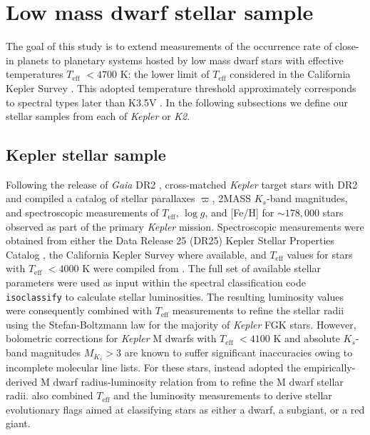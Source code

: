 \documentclass[twocolumn]{emulateapj}
\newcommand{\gaia}[1]{\emph{Gaia}#1}
\newcommand{\kepler}[1]{\emph{Kepler}#1}
\newcommand{\ktwo}[1]{\emph{K2}#1}
\newcommand{\teff}[1]{$T_{\text{eff}}$#1}
\newcommand{\logg}[1]{$\log{g}$#1}
\begin{document}
\section{Low mass dwarf stellar sample} \label{sect:stars}
The goal of this study is to extend measurements of the occurrence rate of close-in planets to planetary systems hosted
by low mass dwarf stars with effective temperatures \teff{} $<4700$ K: the lower limit of \teff{}
considered in the California Kepler Survey \citep[CKS;][]{fulton17}.
This adopted temperature threshold approximately corresponds to spectral types later than
K3.5V \citep{pecaut13}. In the following subsections we define our stellar samples from each of \kepler{} or \ktwo{.}

\subsection{Kepler stellar sample} \label{sect:kep}
Following the release of \gaia{} DR2 \citep{lindegren18}, \cite{berger18} cross-matched \kepler{} target stars
with DR2 and compiled a catalog of stellar
parallaxes $\varpi$, 2MASS $K_s$-band magnitudes, and spectroscopic measurements of \teff{,} \logg{,} and [Fe/H]
for $\sim 178,000$ stars observed as part of the primary \kepler{} mission. Spectroscopic measurements were obtained from
either the Data Release 25 (DR25)
Kepler Stellar Properties Catalog \citep[KSPC;][]{mathur17}, the California
Kepler Survey \citep[CKS;][]{petigura17} where available, and \teff{} values for stars with \teff{} $<4000$ K were compiled from
\cite{gaidos16}. The full set of available stellar parameters were used as input within the spectral classification code
\texttt{isoclassify} \citep{huber17} to calculate stellar luminosities. The resulting luminosity values were consequently combined
with \teff{} measurements to refine the stellar radii using the Stefan-Boltzmann law for the majority of \kepler{} FGK stars.
However, bolometric corrections for \kepler{} M dwarfs with \teff{} $<4100$ K
and absolute $K_s$-band magnitudes $M_{K_s}>3$ are known to suffer significant inaccuracies owing to incomplete
molecular line lists. For these stars, \cite{berger18} instead adopted the empirically-derived M dwarf radius-luminosity
relation from \cite{mann15} to refine the M dwarf stellar radii. \cite{berger18} also combined \teff{} and the 
luminosity measurements to derive stellar evolutionary flags aimed at classifying stars as either a dwarf, a subgiant, or a
red giant.
\end{document}
